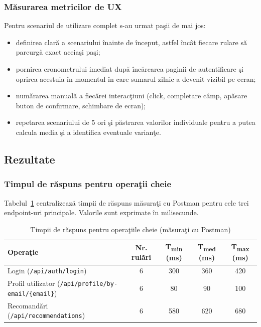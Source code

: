 \documentclass[12pt,a4paper]{article}
\begin{document}
\subsubsection*{M\u{a}surarea metricilor de UX}

Pentru scenariul de utilizare complet s-au urmat pa\c{s}ii de mai jos:
\begin{itemize}
  \item definirea clar\u{a} a scenariului \^{i}nainte de \^{i}nceput, astfel \^{i}nc\^{a}t fiecare rulare s\u{a} parcurg\u{a} exact aceia\c{s}i pa\c{s}i;
  \item pornirea cronometrului imediat dup\u{a} \^{i}nc\u{a}rcarea paginii de autentificare \c{s}i oprirea acestuia \^{i}n momentul \^{i}n care sumarul zilnic a devenit vizibil pe ecran;
  \item num\u{a}rarea manual\u{a} a fiec\u{a}rei interac\c{t}iuni (click, completare c\^{a}mp, ap\u{a}sare buton de confirmare, schimbare de ecran);
  \item repetarea scenariului de 5 ori \c{s}i p\u{a}strarea valorilor individuale pentru a putea calcula media \c{s}i a identifica eventuale varian\c{t}e.
\end{itemize}

\subsection*{Rezultate}

\subsubsection*{Timpul de r\u{a}spuns pentru opera\c{t}ii cheie}

Tabelul~\ref{tab:timpi-operatii} centralizeaz\u{a} timpii de r\u{a}spuns m\u{a}sura\c{t}i cu Postman pentru cele trei endpoint-uri principale. Valorile sunt exprimate \^{i}n milisecunde.

\begin{table}[h!]
  \centering
  \caption{Timpii de r\u{a}spuns pentru opera\c{t}iile cheie (m\u{a}sura\c{t}i cu Postman)}
  \label{tab:timpi-operatii}
  \vspace{4pt}
  \small
  \begin{tabular}{@{}lcccc@{}}
    \toprule
    \textbf{Opera\c{t}ie} & \textbf{Nr. rul\u{a}ri} & \textbf{T\textsubscript{min} (ms)} & \textbf{T\textsubscript{med} (ms)} & \textbf{T\textsubscript{max} (ms)} \\
    \midrule
    Login (\texttt{/api/auth/login})                              & 6 & 300 & 360 & 420 \\
    Profil utilizator (\texttt{/api/profile/by-email/\{email\}})  & 6 & 80  & 90  & 100 \\
    Recomand\u{a}ri (\texttt{/api/recommendations})               & 6 & 580 & 620 & 680 \\
    \bottomrule
  \end{tabular}
\end{table}
\end{document}
